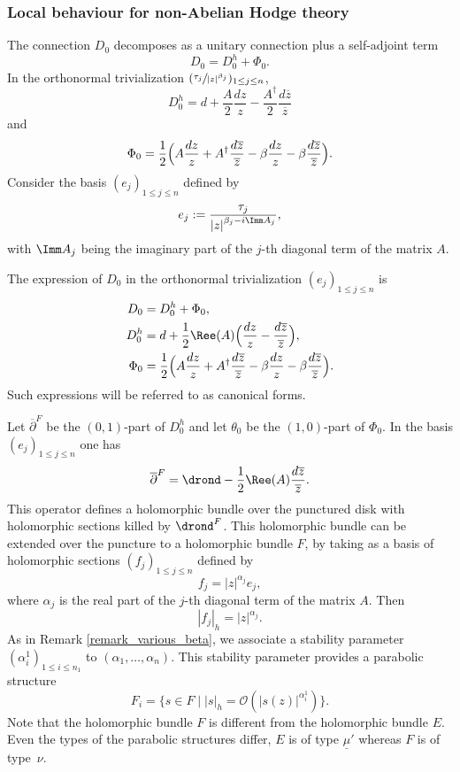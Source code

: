 \subsubsection{Local behaviour for non-Abelian Hodge theory}\label{subsection_local_naht}
The connection $D_0$ decomposes as a unitary connection plus a self-adjoint term
\[
D_0= D_0^h + \Phi_0.
\]
In the orthonormal trivialization $(\sfrac{\tau_j}{|z|^{\beta_j }})_{1\le j \le n}$,
\[
D_0^h = d + \frac{A}{2} \frac{d z}{z} - \frac{A^{\dagger}}{2} \frac{d\overline{z}}{\overline{z}}
\]
and
\[
\Phi_0 = \frac{1}{2} \Bigl(A\frac{d z}{z} + A^{\dagger}\frac{d\overline{z}}{\overline{z}} - \beta \frac{d z}{z} - \beta \frac{d \overline{z}}{\overline{z}}\Bigr).
\]
Consider the basis $(e_j)_{1\le j \le n} $ defined by
\[
e_j := \frac{\tau_j}{\left|z\right|^{\beta_j- i \Imm A_j}},
\]
with $\Imm A_j$ being the imaginary part of the $j$-th diagonal term of the matrix $A$.
\begin{notations}\label{notations_canonical_form}
The expression of $D_0$ in the orthonormal trivialization $(e_j)_{1\le j\le n}$ is
\begin{align*}
D_0 &= D_0^h + \Phi_0,\\
D_0^h &= d +\frac{1}{2} \Ree (A) \Bigl(\frac{d z}{z}- \frac{d\overline{z}}{\overline{z}}\Bigr),\\
\Phi_0 &= \frac{1}{2} \Bigl(A\frac{d z}{z} + A^{\dagger}\frac{d\overline{z}}{\overline{z}} - \beta \frac{d z}{z} - \beta \frac{d \overline{z}}{\overline{z}}\Bigr).
\end{align*}
Such expressions will be referred to as canonical forms.
\end{notations}
Let $\overline{\partial}^F$ be the $(0,1)$-part of $D_0^h$ and let $\theta_0$ be the $(1,0)$-part of $\Phi_0$. In the basis $(e_j)_{1\le j \le n} $ one has
\[
\overline{\partial}^F = \drond - \frac{1}{2} \Ree (A) \frac{d\overline{z}}{\overline{z}}.
\]
This operator defines a holomorphic bundle over the punctured disk with holomorphic sections killed by $\drond^F$. This holomorphic bundle can be extended over the puncture to a holomorphic bundle $F$, by taking as a basis of holomorphic sections $(f_j)_{1\le j \le n}$ defined by
\[
f_j = |z|^{\alpha_j} e_j,
\]
where $\alpha_j$ is the real part of the $j$-th diagonal term of the matrix $A$. Then
\[
|f_j|_h = \left|z\right|^{\alpha_j}.
\]
As in Remark \ref{remark_various_beta}, we associate a stability parameter $(\alpha^1_i)_{1\le i \le n_1}$ to $(\alpha_1,\dots,\alpha_n)$.
This stability parameter provides a parabolic structure
\[
F_i =\lbrace s\in F\mid |s|_h=\mathcal{O}(|s(z)|^{\alpha_i^1})\rbrace.
\]
Note that the holomorphic bundle $F$ is different from the holomorphic bundle $E$. Even the types of the parabolic structures differ, $E$ is of type $\underline{\mu}'$ whereas $F$ is of type~$\nu$.

